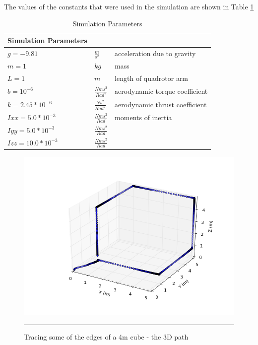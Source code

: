 The values of the constants that were used in the simulation are shown in Table \ref{table:params}
\begin{table}\label{table:params}
\begin{doublespace}
\centering
\begin{tabular}{l l l}
    Simulation Parameters\\
    \hline
    $g = -9.81            $& $ \frac{m}{s^2}          $ & acceleration due to gravity\\
    $m = 1                $& $ kg                      $ & mass\\ 
    $L = 1                $& $ m                       $ & length of quadrotor arm\\
    $b = 10^{-6}          $& $ \frac{N m s^2}{Rad^2}  $ & aerodynamic torque coefficient\\
    $k = 2.45*10^{-6}     $& $ \frac{N s^2}{Rad^2}    $ & aerodynamic thrust coefficient\\
    $Ixx = 5.0*10^{-3}    $& $ \frac{N m s^2}{Rad}    $ & moments of inertia \\
    $Iyy = 5.0*10^{-3}    $& $ \frac{N m s^2}{Rad}    $ & \\
    $Izz = 10.0*10^{-3}   $& $ \frac{N m s^2}{Rad}    $ & \\
    \hline
\end{tabular}
\caption[Simulation Parameters]{Simulation Parameters}
\end{doublespace}
\end{table}







\begin{figure}[htbp]
	\centering
		\includegraphics[width=\textwidth]{Figures/CubeEdges3D.png}
		\rule{35em}{0.5pt}
	\caption[Cube Edges]{Tracing some of the edges of a 4m cube - the 3D path}
	\label{fig:Cube Edges 3D}
\end{figure}


